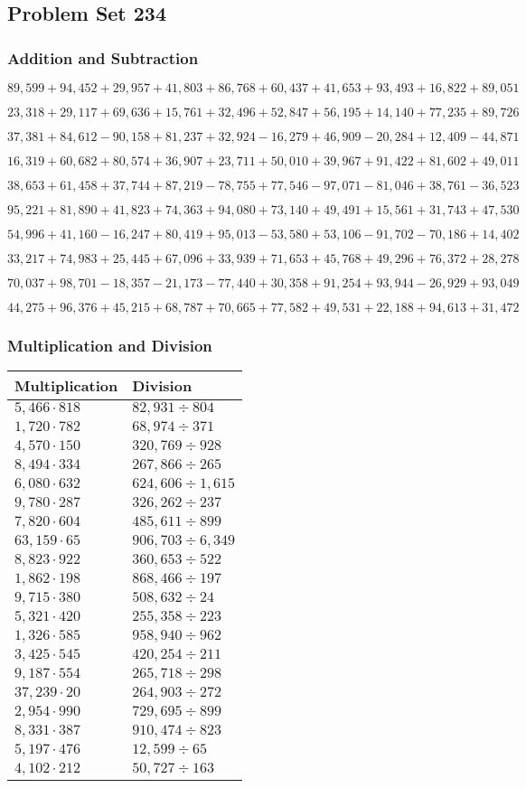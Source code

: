 \hypertarget{problem-set-234}{%
\subsection{Problem Set 234}\label{problem-set-234}}

\hypertarget{addition-and-subtraction}{%
\subsubsection{Addition and
Subtraction}\label{addition-and-subtraction}}

\(89,599+94,452+29,957+41,803+86,768+60,437+41,653+93,493+16,822+89,051\)

\(23,318+29,117+69,636+15,761+32,496+52,847+56,195+14,140+77,235+89,726\)

\(37,381+84,612-90,158+81,237+32,924-16,279+46,909-20,284+12,409-44,871\)

\(16,319+60,682+80,574+36,907+23,711+50,010+39,967+91,422+81,602+49,011\)

\(38,653+61,458+37,744+87,219-78,755+77,546-97,071-81,046+38,761-36,523\)

\(95,221+81,890+41,823+74,363+94,080+73,140+49,491+15,561+31,743+47,530\)

\(54,996+41,160-16,247+80,419+95,013-53,580+53,106-91,702-70,186+14,402\)

\(33,217+74,983+25,445+67,096+33,939+71,653+45,768+49,296+76,372+28,278\)

\(70,037+98,701-18,357-21,173-77,440+30,358+91,254+93,944-26,929+93,049\)

\(44,275+96,376+45,215+68,787+70,665+77,582+49,531+22,188+94,613+31,472\)

\hypertarget{multiplication-and-division}{%
\subsubsection{Multiplication and
Division}\label{multiplication-and-division}}

\begin{longtable}[]{@{}ll@{}}
\toprule
Multiplication & Division\tabularnewline
\midrule
\endhead
\(5,466\cdot818\) & \(82,931÷804\)\tabularnewline
\(1,720\cdot782\) & \(68,974÷371\)\tabularnewline
\(4,570\cdot150\) & \(320,769÷928\)\tabularnewline
\(8,494\cdot334\) & \(267,866÷265\)\tabularnewline
\(6,080\cdot632\) & \(624,606÷1,615\)\tabularnewline
\(9,780\cdot287\) & \(326,262÷237\)\tabularnewline
\(7,820\cdot604\) & \(485,611÷899\)\tabularnewline
\(63,159\cdot65\) & \(906,703÷6,349\)\tabularnewline
\(8,823\cdot922\) & \(360,653÷522\)\tabularnewline
\(1,862\cdot198\) & \(868,466÷197\)\tabularnewline
\(9,715\cdot380\) & \(508,632÷24\)\tabularnewline
\(5,321\cdot420\) & \(255,358÷223\)\tabularnewline
\(1,326\cdot585\) & \(958,940÷962\)\tabularnewline
\(3,425\cdot545\) & \(420,254÷211\)\tabularnewline
\(9,187\cdot554\) & \(265,718÷298\)\tabularnewline
\(37,239\cdot20\) & \(264,903÷272\)\tabularnewline
\(2,954\cdot990\) & \(729,695÷899\)\tabularnewline
\(8,331\cdot387\) & \(910,474÷823\)\tabularnewline
\(5,197\cdot476\) & \(12,599÷65\)\tabularnewline
\(4,102\cdot212\) & \(50,727÷163\)\tabularnewline
\bottomrule
\end{longtable}
